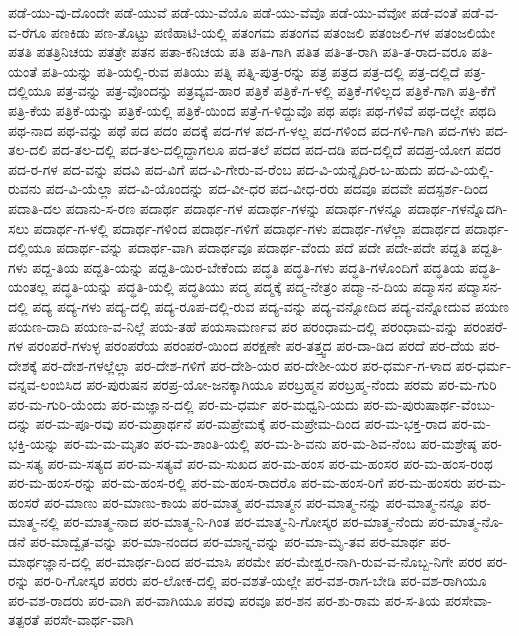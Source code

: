 ಪಡೆ-ಯು-ವು-ದೊಂದೇ
ಪಡೆ-ಯುವೆ
ಪಡೆ-ಯು-ವೆಯೊ
ಪಡೆ-ಯು-ವೆವೊ
ಪಡೆ-ಯು-ವೆವೋ
ಪಡೆ-ವಂತೆ
ಪಡೆ-ವ-ವ-ರೆಗೂ
ಪಣಕಿಡು
ಪಣ-ತೊಟ್ಟು
ಪಣಿಹಾಟಿ-ಯಲ್ಲಿ
ಪತಂಗಮ
ಪತಂಗವ
ಪತಂಜಲಿ
ಪತಂಜಲಿ-ಗಳ
ಪತಂಜಲಿಯೇ
ಪತತಿ
ಪತತ್ರಿನಿಚಯ
ಪತತ್ರೇ
ಪತನ
ಪತಾ-ಕನಿಚಯ
ಪತಿ
ಪತಿ-ಗಾಗಿ
ಪತಿತ
ಪತಿ-ತ-ರಾಗಿ
ಪತಿ-ತ-ರಾದ-ವರೂ
ಪತಿ-ಯಂತೆ
ಪತಿ-ಯನ್ನು
ಪತಿ-ಯಲ್ಲಿ-ರುವ
ಪತಿಯು
ಪತ್ನಿ
ಪತ್ನಿ-ಪುತ್ರ-ರನ್ನು
ಪತ್ರ
ಪತ್ರದ
ಪತ್ರ-ದಲ್ಲಿ
ಪತ್ರ-ದಲ್ಲಿದೆ
ಪತ್ರ-ದಲ್ಲಿಯೂ
ಪತ್ರ-ವನ್ನು
ಪತ್ರ-ವೊಂದನ್ನು
ಪತ್ರವ್ಯವ-ಹಾರ
ಪತ್ರಿಕೆ
ಪತ್ರಿಕೆ-ಗ-ಳಲ್ಲಿ
ಪತ್ರಿಕೆ-ಗಳಿಲ್ಲದ
ಪತ್ರಿಕೆ-ಗಾಗಿ
ಪತ್ರಿ-ಕೆಗೆ
ಪತ್ರಿ-ಕೆಯ
ಪತ್ರಿಕೆ-ಯನ್ನು
ಪತ್ರಿಕೆ-ಯಲ್ಲಿ
ಪತ್ರಿಕೆ-ಯಿಂದ
ಪತ್ರೆ-ಗ-ಳಿದ್ದುವೊ
ಪಥ
ಪಥಃ
ಪಥ-ಗಳಿವೆ
ಪಥ-ದಲ್ಲೇ
ಪಥದಿ
ಪಥ-ನಾದ
ಪಥ-ವನ್ನು
ಪಥೆ
ಪದ
ಪದಂ
ಪದಕ್ಕೆ
ಪದ-ಗಳ
ಪದ-ಗ-ಳಲ್ಲ
ಪದ-ಗಳಿಂದ
ಪದ-ಗಳಿ-ಗಾಗಿ
ಪದ-ಗಳು
ಪದ-ತಲ-ದಲಿ
ಪದ-ತಲ-ದಲ್ಲಿ
ಪದ-ತಲ-ದಲ್ಲಿದ್ದಾಗಲೂ
ಪದ-ತಲೆ
ಪದದ
ಪದ-ದಡಿ
ಪದ-ದಲ್ಲಿದೆ
ಪದಪ್ರ-ಯೋಗ
ಪದರ
ಪದ-ರ-ಗಳ
ಪದ-ವನ್ನು
ಪದವಿ
ಪದ-ವಿಗೆ
ಪದ-ವಿ-ಗೇರು-ವ-ರೆಂಬ
ಪದ-ವಿ-ಯನ್ನೈದಿರ-ಬ-ಹುದು
ಪದ-ವಿ-ಯಲ್ಲಿ-ರುವನು
ಪದ-ವಿ-ಯೆಲ್ಲಾ
ಪದ-ವಿ-ಯೊಂದನ್ನು
ಪದ-ವೀ-ಧರ
ಪದ-ವೀಧ-ರರು
ಪದವೂ
ಪದವೇ
ಪದಸ್ಪರ್ಶ-ದಿಂದ
ಪದಾತಿ-ದಲ
ಪದಾನು-ಸ-ರಣ
ಪದಾರ್ಥ
ಪದಾರ್ಥ-ಗಳ
ಪದಾರ್ಥ-ಗಳನ್ನು
ಪದಾರ್ಥ-ಗಳನ್ನೂ
ಪದಾರ್ಥ-ಗಳನ್ನೊದಗಿ-ಸಲು
ಪದಾರ್ಥ-ಗ-ಳಲ್ಲಿ
ಪದಾರ್ಥ-ಗಳಿಂದ
ಪದಾರ್ಥ-ಗಳಿಗೆ
ಪದಾರ್ಥ-ಗಳು
ಪದಾರ್ಥ-ಗಳೆಲ್ಲಾ
ಪದಾರ್ಥದ
ಪದಾರ್ಥ-ದಲ್ಲಿಯೂ
ಪದಾರ್ಥ-ವನ್ನು
ಪದಾರ್ಥ-ವಾಗಿ
ಪದಾರ್ಥವೂ
ಪದಾರ್ಥ-ವೆಂದು
ಪದೆ
ಪದೇ
ಪದೇ-ಪದೇ
ಪದ್ದತಿ
ಪದ್ದತಿ-ಗಳು
ಪದ್ದ-ತಿಯ
ಪದ್ದತಿ-ಯನ್ನು
ಪದ್ದತಿ-ಯಿರ-ಬೇಕೆಂದು
ಪದ್ಧತಿ
ಪದ್ಧತಿ-ಗಳು
ಪದ್ಧತಿ-ಗಳೊಂದಿಗೆ
ಪದ್ಧತಿಯ
ಪದ್ಧತಿ-ಯಂತಲ್ಲ
ಪದ್ಧತಿ-ಯನ್ನು
ಪದ್ಧತಿ-ಯಲ್ಲಿ
ಪದ್ಧತಿಯು
ಪದ್ಮ
ಪದ್ಮಕ್ಕೆ
ಪದ್ಮ-ನೇತ್ರಂ
ಪದ್ಮಾ-ನ-ದಿಯ
ಪದ್ಮಾಸನ
ಪದ್ಮಾಸನ-ದಲ್ಲಿ
ಪದ್ಯ
ಪದ್ಯ-ಗಳು
ಪದ್ಯ-ದಲ್ಲಿ
ಪದ್ಯ-ರೂಪ-ದಲ್ಲಿ-ರುವ
ಪದ್ಯ-ವನ್ನು
ಪದ್ಯ-ವನ್ನೋದಿದ
ಪದ್ಯ-ವನ್ನೋದುವ
ಪಯಣ
ಪಯಣ-ದಾದಿ
ಪಯಣ-ವ-ನಿಲ್ಲೆ
ಪಯ-ತಹೆ
ಪಯಸಾಮರ್ಣವ
ಪರ
ಪರಂಧಾಮ-ದಲ್ಲಿ
ಪರಂಧಾಮ-ವನ್ನು
ಪರಂಪರೆ-ಗಳ
ಪರಂಪರೆ-ಗಳುಳ್ಳ
ಪರಂಪರೆಯ
ಪರಂಪರೆ-ಯಿಂದ
ಪರಕ್ಷಣೇ
ಪರ-ತತ್ತ್ವದ
ಪರ-ದಾ-ಡಿದ
ಪರದೆ
ಪರ-ದೆಯ
ಪರ-ದೇಶಕ್ಕೆ
ಪರ-ದೇಶ-ಗಳಲ್ಲೆಲ್ಲಾ
ಪರ-ದೇಶ-ಗಳಿಗೆ
ಪರ-ದೇಶಿ-ಯರ
ಪರ-ದೇಶೀ-ಯರ
ಪರ-ಧರ್ಮ-ಗ-ಳಾದ
ಪರ-ಧರ್ಮ-ವನ್ನವ-ಲಂಬಿಸಿದ
ಪರ-ಪುರುಷನ
ಪರಪ್ರ-ಯೋ-ಜನಕ್ಕಾಗಿಯೂ
ಪರಬ್ರಹ್ಮನ
ಪರಬ್ರಹ್ಮ-ನೆಂದು
ಪರಮ
ಪರ-ಮ-ಗುರಿ
ಪರ-ಮ-ಗುರಿ-ಯೆಂದು
ಪರ-ಮಜ್ಞಾನ-ದಲ್ಲಿ
ಪರ-ಮ-ಧರ್ಮ
ಪರ-ಮಧ್ವನಿ-ಯದು
ಪರ-ಮ-ಪುರುಷಾರ್ಥ-ವೆಂಬು-ದನ್ನು
ಪರ-ಮ-ಪೂ-ರವು
ಪರ-ಮಪ್ರಾರ್ಥನೆ
ಪರ-ಮಪ್ರೇಮಕ್ಕೆ
ಪರ-ಮಪ್ರೇಮ-ದಿಂದ
ಪರ-ಮ-ಭಕ್ತ-ರಾದ
ಪರ-ಮ-ಭಕ್ತಿ-ಯನ್ನು
ಪರ-ಮ-ಮ-ಮೃತಂ
ಪರ-ಮ-ಶಾಂತಿ-ಯಲ್ಲಿ
ಪರ-ಮ-ಶಿ-ವನು
ಪರ-ಮ-ಶಿವ-ನೆಂಬ
ಪರ-ಮಶ್ರೇಷ್ಠ
ಪರ-ಮ-ಸತ್ಯ
ಪರ-ಮ-ಸತ್ಯದ
ಪರ-ಮ-ಸತ್ಯವೆ
ಪರ-ಮ-ಸುಖದ
ಪರ-ಮ-ಹಂಸ
ಪರ-ಮ-ಹಂಸರ
ಪರ-ಮ-ಹಂಸ-ರಂಥ
ಪರ-ಮ-ಹಂಸ-ರನ್ನು
ಪರ-ಮ-ಹಂಸ-ರಲ್ಲಿ
ಪರ-ಮ-ಹಂಸ-ರಾದರೊ
ಪರ-ಮ-ಹಂಸ-ರಿಗೆ
ಪರ-ಮ-ಹಂಸರು
ಪರ-ಮ-ಹಂಸರೆ
ಪರ-ಮಾಣು
ಪರ-ಮಾಣು-ಕಾಯ
ಪರ-ಮಾತ್ಮ
ಪರ-ಮಾತ್ಮನ
ಪರ-ಮಾತ್ಮ-ನನ್ನು
ಪರ-ಮಾತ್ಮ-ನನ್ನೂ
ಪರ-ಮಾತ್ಮ-ನಲ್ಲಿ
ಪರ-ಮಾತ್ಮ-ನಾದ
ಪರ-ಮಾತ್ಮ-ನಿ-ಗಿಂತ
ಪರ-ಮಾತ್ಮ-ನಿ-ಗೋಸ್ಕರ
ಪರ-ಮಾತ್ಮ-ನೆಂದು
ಪರ-ಮಾತ್ಮ-ನೊ-ಡನೆ
ಪರ-ಮಾದ್ವೈತ-ವನ್ನು
ಪರ-ಮಾ-ನಂದದ
ಪರ-ಮಾನ್ನ-ವನ್ನು
ಪರ-ಮಾ-ಮೃ-ತವ
ಪರ-ಮಾರ್ಥ
ಪರ-ಮಾರ್ಥಜ್ಞಾನ-ದಲ್ಲಿ
ಪರ-ಮಾರ್ಥ-ದಿಂದ
ಪರ-ಮಾಸಿ
ಪರಮೇ
ಪರ-ಮೇಶ್ವರ-ನಾಗಿ-ರುವ-ವ-ನೊಬ್ಬ-ನಿಗೇ
ಪರರ
ಪರ-ರನ್ನು
ಪರ-ರಿ-ಗೋಸ್ಕರ
ಪರರು
ಪರ-ಲೋಕ-ದಲ್ಲಿ
ಪರ-ವಶತೆ-ಯಲ್ಲೇ
ಪರ-ವಶ-ರಾಗ-ಬೇಡಿ
ಪರ-ವಶ-ರಾಗಿಯೂ
ಪರ-ವಶ-ರಾದರು
ಪರ-ವಾಗಿ
ಪರ-ವಾಗಿಯೂ
ಪರವು
ಪರವೂ
ಪರ-ಶನ
ಪರ-ಶು-ರಾಮ
ಪರ-ಸ-ತಿಯ
ಪರಸೇವಾ-ತತ್ಪರತೆ
ಪರಸೇ-ವಾರ್ಥ-ವಾಗಿ
